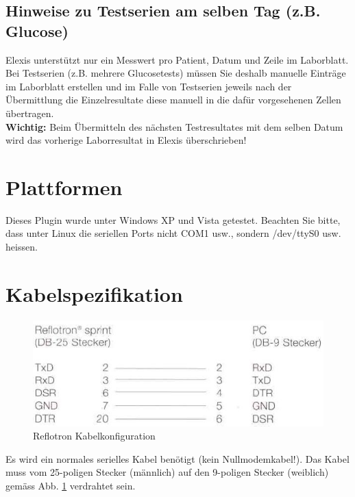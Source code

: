 \documentclass[a4paper]{scrartcl}
\begin{document}
\subsection{Hinweise zu Testserien am selben Tag (z.B. Glucose)}
Elexis unterst\"utzt nur ein Messwert pro Patient, Datum und Zeile im Laborblatt. Bei Testserien (z.B. mehrere Glucosetests) m\"ussen Sie deshalb manuelle Eintr\"age im Laborblatt erstellen und im Falle von Testserien jeweils nach der \"Ubermittlung die Einzelresultate diese manuell in die daf\"ur vorgesehenen Zellen \"ubertragen.\\
\textbf{Wichtig:} Beim \"Ubermitteln des n\"achsten Testresultates mit dem selben Datum wird das vorherige Laborresultat in Elexis \"uberschrieben!
\section{Plattformen}
Dieses Plugin wurde unter Windows XP und Vista getestet. Beachten Sie bitte, dass unter Linux die seriellen Ports nicht COM1 usw., sondern /dev/ttyS0 usw. heissen.

\section{Kabelspezifikation}
\begin{figure}[h]
    \includegraphics{kabel}
    \caption{Reflotron Kabelkonfiguration}
    \label{fig:kabel}
\end{figure}
Es wird ein normales serielles Kabel ben\"otigt (kein Nullmodemkabel!). Das Kabel muss vom 25-poligen Stecker (m\"annlich) auf den 9-poligen Stecker (weiblich) gem\"ass Abb. \ref{fig:kabel} verdrahtet sein.
\end{document}
